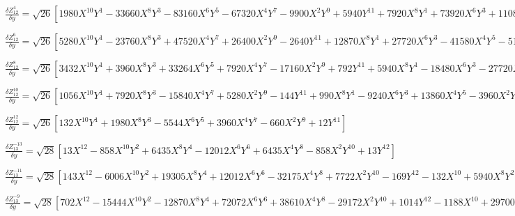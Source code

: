 \documentclass[10pt,landscape]{article}
\begin{document}
\vspace{1.2 mm}
\noindent $ \frac{\delta Z^{4}_{12}}{\delta y} = \sqrt{26} [1980X^{10}Y^{1} -33660X^{8}Y^{3} -83160X^{6}Y^{5} -67320X^{4}Y^{7} -9900X^{2}Y^{9} +5940Y^{11} +7920X^{8}Y^{1} +73920X^{6}Y^{3} +110880X^{4}Y^{5} +31680X^{2}Y^{7} -13200Y^{9} -10080X^{6}Y^{1} -50400X^{4}Y^{3} -30240X^{2}Y^{5} +10080Y^{7} +5040X^{4}Y^{1} +10080X^{2}Y^{3} -3024Y^{5} -840X^{2}Y^{1} +280Y^{3}] $

\vspace{1.2 mm}
\noindent $ \frac{\delta Z^{6}_{12}}{\delta y} = \sqrt{26} [5280X^{10}Y^{1} -23760X^{8}Y^{3} +47520X^{4}Y^{7} +26400X^{2}Y^{9} -2640Y^{11} +12870X^{8}Y^{1} +27720X^{6}Y^{3} -41580X^{4}Y^{5} -51480X^{2}Y^{7} +4950Y^{9} -10080X^{6}Y^{1} +30240X^{2}Y^{5} -2880Y^{7} +2520X^{4}Y^{1} -5040X^{2}Y^{3} +504Y^{5}] $

\vspace{1.2 mm}
\noindent $ \frac{\delta Z^{8}_{12}}{\delta y} = \sqrt{26} [3432X^{10}Y^{1} +3960X^{8}Y^{3} +33264X^{6}Y^{5} +7920X^{4}Y^{7} -17160X^{2}Y^{9} +792Y^{11} +5940X^{8}Y^{1} -18480X^{6}Y^{3} -27720X^{4}Y^{5} +23760X^{2}Y^{7} -1100Y^{9} -2520X^{6}Y^{1} +12600X^{4}Y^{3} -7560X^{2}Y^{5} +360Y^{7}] $

\vspace{1.2 mm}
\noindent $ \frac{\delta Z^{10}_{12}}{\delta y} = \sqrt{26} [1056X^{10}Y^{1} +7920X^{8}Y^{3} -15840X^{4}Y^{7} +5280X^{2}Y^{9} -144Y^{11} +990X^{8}Y^{1} -9240X^{6}Y^{3} +13860X^{4}Y^{5} -3960X^{2}Y^{7} +110Y^{9}] $

\vspace{1.2 mm}
\noindent $ \frac{\delta Z^{12}_{12}}{\delta y} = \sqrt{26} [132X^{10}Y^{1} +1980X^{8}Y^{3} -5544X^{6}Y^{5} +3960X^{4}Y^{7} -660X^{2}Y^{9} +12Y^{11}] $

\vspace{1.2 mm}
\noindent $ \frac{\delta Z^{-13}_{13}}{\delta y} = \sqrt{28} [13X^{12} -858X^{10}Y^{2} +6435X^{8}Y^{4} -12012X^{6}Y^{6} +6435X^{4}Y^{8} -858X^{2}Y^{10} +13Y^{12}] $

\vspace{1.2 mm}
\noindent $ \frac{\delta Z^{-11}_{13}}{\delta y} = \sqrt{28} [143X^{12} -6006X^{10}Y^{2} +19305X^{8}Y^{4} +12012X^{6}Y^{6} -32175X^{4}Y^{8} +7722X^{2}Y^{10} -169Y^{12} -132X^{10} +5940X^{8}Y^{2} -27720X^{6}Y^{4} +27720X^{4}Y^{6} -5940X^{2}Y^{8} +132Y^{10}] $

\vspace{1.2 mm}
\noindent $ \frac{\delta Z^{-9}_{13}}{\delta y} = \sqrt{28} [702X^{12} -15444X^{10}Y^{2} -12870X^{8}Y^{4} +72072X^{6}Y^{6} +38610X^{4}Y^{8} -29172X^{2}Y^{10} +1014Y^{12} -1188X^{10} +29700X^{8}Y^{2} -27720X^{6}Y^{4} -83160X^{4}Y^{6} +41580X^{2}Y^{8} -1452Y^{10} +495X^{8} -13860X^{6}Y^{2} +34650X^{4}Y^{4} -13860X^{2}Y^{6} +495Y^{8}] $
\end{document}
